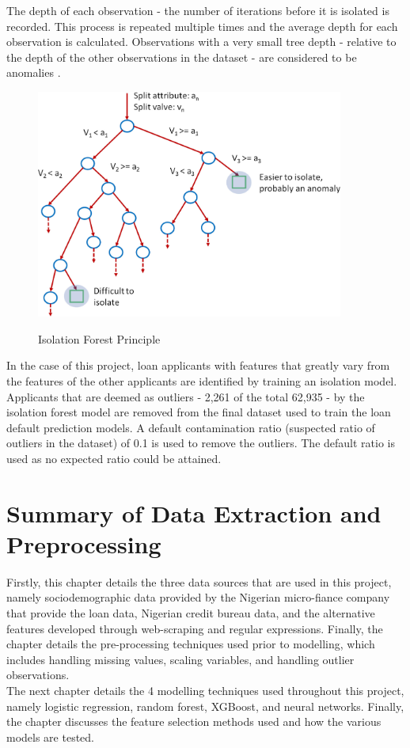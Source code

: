 The depth of each observation - the number of iterations before it is isolated  is recorded. This process is repeated multiple times and the average depth for each observation is calculated. Observations with a very small tree depth - relative to the depth of the other observations in the dataset - are considered to be anomalies \parencite{Outlier2}. \\

\vspace{10pt}

\begin{figure}[!htb]
\centering
\includegraphics[width=0.9\textwidth]{images/isolation_tree.jpg}
\caption{Isolation Forest Principle}
\label{fig:isolation}
\parencite{Outlier1}
\end{figure}


In the case of this project, loan applicants with features that greatly vary from the features of the other applicants are identified by training an isolation model. Applicants that are deemed as outliers - 2,261 of the total 62,935 - by the isolation forest model are removed from the final dataset used to train the loan default prediction models. A default contamination ratio (suspected ratio of outliers in the dataset) of 0.1 is used to remove the outliers. The default ratio is used as no expected ratio could be attained. \\


\section{Summary of Data Extraction and Preprocessing}

Firstly, this chapter details the three data sources that are used in this project, namely sociodemographic data provided by the Nigerian micro-fiance company that provide the loan data, Nigerian credit bureau data, and the alternative features developed through web-scraping and regular expressions. Finally, the chapter details the pre-processing techniques used prior to modelling, which includes handling missing values, scaling variables, and handling outlier observations. \\

The next chapter details the 4 modelling techniques used throughout this project, namely logistic regression, random forest, XGBoost, and neural networks. Finally, the chapter discusses the feature selection methods used and how the various models are tested.  